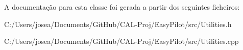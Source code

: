 A documentação para esta classe foi gerada a partir dos seguintes ficheiros\+:\begin{DoxyCompactItemize}
\item 
C\+:/\+Users/josea/\+Documents/\+Git\+Hub/\+C\+A\+L-\/\+Proj/\+Easy\+Pilot/src/Utilities.\+h\item 
C\+:/\+Users/josea/\+Documents/\+Git\+Hub/\+C\+A\+L-\/\+Proj/\+Easy\+Pilot/src/Utilities.\+cpp\end{DoxyCompactItemize}

